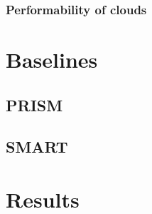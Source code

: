 \subsubsection{Performability of clouds}

\section{Baselines}

\subsection{PRISM}

\subsection{SMART}

\section{Results}
\label{sec:evaluation:results}